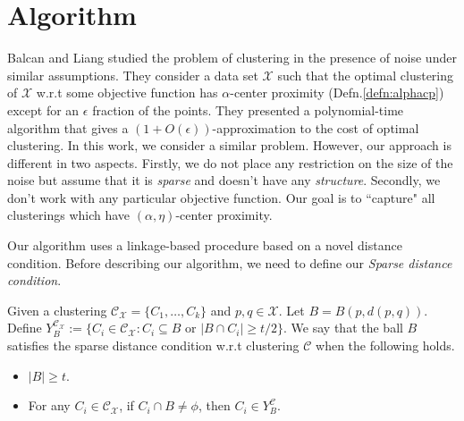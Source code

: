 \documentclass[11pt]{article}
\newcommand{\mc}{\mathcal}
\begin{document}
\section{Algorithm}
Balcan and Liang studied the problem of clustering in the presence of noise under similar assumptions. They consider a data set $\mc X$ such that the optimal clustering of $\mc X$ w.r.t some objective function has $\alpha$-center proximity (Defn.\ref{defn:alphacp}) except for an $\epsilon$ fraction of the points. They presented a polynomial-time algorithm that gives a $(1+O(\epsilon))$-approximation to the cost of optimal clustering. %
In this work, we consider a similar problem. However, our approach is different in two aspects. Firstly, we do not place any restriction on the size of the noise but assume that it is {\it sparse} and doesn't have any {\it structure}. Secondly, we don't work with any particular objective function. Our goal is to ``capture" all clusterings which have $(\alpha, \eta)$-center proximity.

Our algorithm uses a linkage-based procedure based on a novel distance condition. Before describing our algorithm, we need to define our {\it Sparse distance condition}.

\begin{definition}
	 Given a clustering $\mc C_{\mc X}=\{C_1,\ldots,C_k\}$ and $p, q \in \mc X$. Let $B = B(p, d(p, q))$. Define $Y_B^{\mc C_{\mc X}} := \{C_i \in \mc C_{\mc X} : C_i \subseteq B \text{ or } |B \cap C_i| \ge t/2\}$. 
We say that the ball $B$ satisfies the sparse distance condition w.r.t clustering $\mc C$ when the following holds.
\begin{itemize}[noitemsep, leftmargin=*]
\item $|B| \ge t$.
\item For any $C_i \in \mc C_{\mc X}$, if $C_i \cap B \neq \phi$, then $C_i \in Y_B^{\mc C}$.
\end{itemize}
\end{definition}
\end{document}
